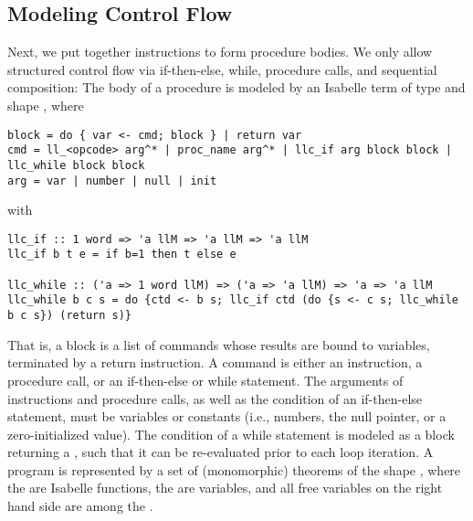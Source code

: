 \documentclass[a4paper,USenglish,cleveref, autoref]{lipics-v2019}
\begin{document}
\subsection{Modeling Control Flow}\label{sec:modeling_ctrl_flow}
Next, we put together instructions to form procedure bodies. We only allow structured control flow 
via if-then-else, while, procedure calls, and sequential composition: The body of
a procedure is modeled by an Isabelle term of type  and shape , where
\begin{lstlisting}
block = do { var <- cmd; block } | return var
cmd = ll_<opcode> arg^* | proc_name arg^* | llc_if arg block block | llc_while block block
arg = var | number | null | init
\end{lstlisting}
with
\begin{lstlisting}
llc_if :: 1 word => 'a llM => 'a llM => 'a llM
llc_if b t e = if b=1 then t else e

llc_while :: ('a => 1 word llM) => ('a => 'a llM) => 'a => 'a llM
llc_while b c s = do {ctd <- b s; llc_if ctd (do {s <- c s; llc_while b c s}) (return s)}
\end{lstlisting}
That is, a block is a list of commands whose results are bound to variables, terminated by a return instruction. 
A command is either an instruction, a procedure call, or an if-then-else or while statement.
The arguments of instructions and procedure calls, as well as the condition of an if-then-else statement, must be variables or 
constants (i.e., numbers, the null pointer, or a zero-initialized value). 
The condition of a while statement is modeled as a block returning a , such that it can be re-evaluated prior to each loop iteration.
%
A program is represented by a set of (monomorphic) theorems of the shape
,
where the  are Isabelle functions, the  are variables, and all free variables on the right hand side are among the .
\end{document}
